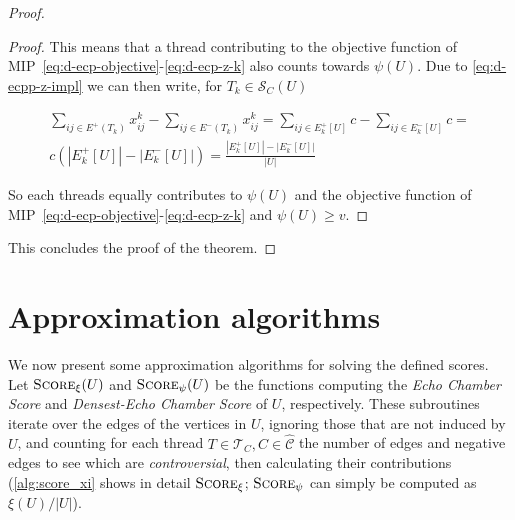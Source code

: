 \begin{proof}
\begin{proof}
		This means that a thread contributing to the objective function of
		MIP~\ref{eq:d-ecp-objective}-\ref{eq:d-ecp-z-k} also counts towards
		$\psi(U)$. Due to \autoref{eq:d-ecpp-z-impl} we can then write, for
		$T_k \in \mathcal{S}_C(U)$

		\begin{multline*}
			\sum^{}_{ij \in E^{+} (T_{k})} x_{ij} ^{k} - \sum_{ij \in E^{-}
				(T_{k})} x_{ij} ^{k} = \sum^{}_{ij \in E^{+}_k[U] } c - \sum_{ij \in E^{-}
			_k[U]} c = \\ c (|E^{+}_{k}[U]| - |E^{-}_{k}[U]|) =
			\frac{|E^{+}_{k}[U]| - |E^{-}_{k}[U]|}{|U|}
		\end{multline*}

		So each threads equally contributes to $\psi(U)$ and the objective
		function of MIP~\ref{eq:d-ecp-objective}-\ref{eq:d-ecp-z-k} and
		$\psi(U) \geq v$.
	\end{proof}

	This concludes the proof of the theorem.

\end{proof}

\section{Approximation algorithms}%
\label{sub:approximation_algorithms}

We now present some approximation algorithms for solving the defined scores.
Let $\textsc{Score}_{\xi} (U)$ and $\textsc{Score}_{\psi} (U)$ be the functions computing the
\emph{Echo Chamber Score} and \emph{Densest-Echo Chamber Score} of $U$,
respectively. These subroutines iterate over the edges of the vertices in $U$,
ignoring those that are not induced by $U$, and counting for each thread $T \in
	\mathcal{T}_{C}, C \in \mathcal{\hat{C}} $ the number of edges and negative edges
to see which are \emph{controversial}, then calculating their contributions
(\autoref{alg:score_xi} shows in detail $\textsc{Score}_\xi$;
$\textsc{Score}_\psi$ can simply be computed as $\xi(U)/|U|$).

